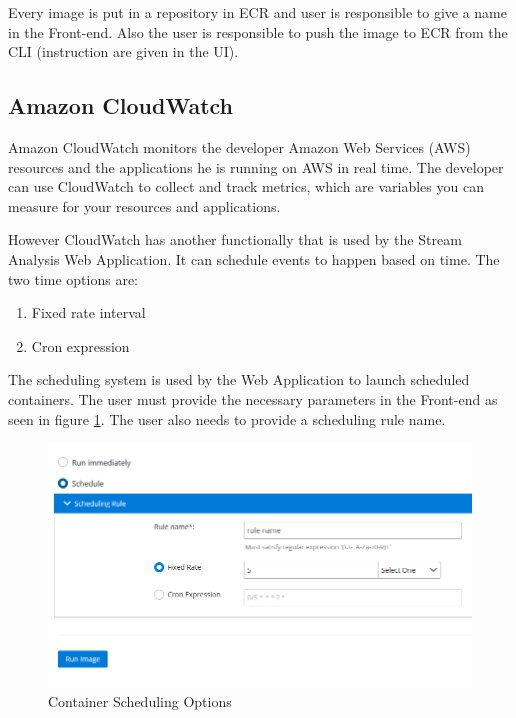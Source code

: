 Every image is put in a repository in ECR and user is responsible to give a name in the Front-end. Also the user is responsible to push the image to ECR from the CLI (instruction are given in the UI).

\newpage

\subsection{Amazon CloudWatch}
\label{chap:04:03:03}

Amazon CloudWatch monitors the developer Amazon Web Services (AWS) resources and the applications he is running on AWS in real time. The developer can use CloudWatch to collect and track metrics, which are variables you can measure for your resources and applications.\cite{aws-cloudwatch}

However CloudWatch has another functionally that is used by the Stream Analysis Web Application. It can schedule events to happen based on time. The two time options are:

\begin{enumerate}
	\item Fixed rate interval
	\item Cron expression
\end{enumerate}

The scheduling system is used by the Web Application to launch scheduled containers. The user must provide the necessary parameters in the Front-end as seen in figure \ref{fig:schedulingOptions}. The user also needs to provide a scheduling rule name.

\begin{figure}[h]
	\centering
	\includegraphics[width=1\linewidth]{./images/webapp/schedulingOptions.PNG}
	\caption{Container Scheduling Options}
	\label{fig:schedulingOptions}
\end{figure}

